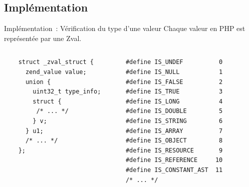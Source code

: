 \documentclass[10pt]{beamer}
\begin{document}
\subsection{Implémentation}
\begin{frame}[fragile]{Implémentation~: Vérification du type d'une valeur}
    Chaque valeur en PHP est représentée par une \alert{Zval}.
      \begin{columns}[T,onlytextwidth]
    \begin{verbatim}
    struct _zval_struct {
      zend_value value;
      union {
        uint32_t type_info;
        struct {
         /* ... */
        } v;
      } u1;
      /* ... */
    };
    \end{verbatim}
    
    \begin{verbatim}
    #define IS_UNDEF          0
    #define IS_NULL           1
    #define IS_FALSE          2
    #define IS_TRUE           3
    #define IS_LONG           4
    #define IS_DOUBLE         5
    #define IS_STRING         6
    #define IS_ARRAY          7
    #define IS_OBJECT         8
    #define IS_RESOURCE       9
    #define IS_REFERENCE     10
    #define IS_CONSTANT_AST  11
    /* ... */
    \end{verbatim}
      \end{columns}
\end{frame}
\end{document}
